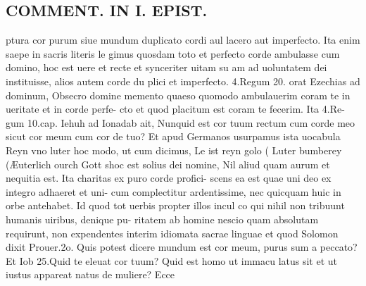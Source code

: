 \documentclass{article}
\begin{document}
\begin{pages}
\section*{COMMENT. IN I. EPIST. }\pstart ptura cor purum siue mundum duplicato cordi aul lacero aut imperfecto. Ita enim saepe in sacris literis le gimus quosdam toto et perfecto corde ambulasse cum domino, hoc est uere et recte et synceriter uitam su am ad uoluntatem dei instituisse, alios autem corde du plici et imperfecto. 4.Regum 20. orat Ezechias ad dominum, Obsecro domine memento quaeso quomodo ambulauerim coram te in ueritate et in corde perfe- cto et quod placitum est coram te fecerim. Ita 4.Re- gum 10.cap. Iehuh ad Ionadab ait, Nunquid est cor tuum rectum cum corde meo sicut cor meum cum cor de tuo? Et apud Germanos usurpamus ista uocabula Reyn vno luter hoc modo, ut cum dicimus, Le ist reyn golo ( Luter bumberey (Æuterlich ourch Gott shoc est solius dei nomine, Nil aliud quam aurum et nequitia est. Ita charitas ex puro corde profici- scens ea est quae uni deo ex integro adhaeret et uni- cum complectitur ardentissime, nec quicquam huic in orbe antehabet. Id quod tot uerbis propter illos incul co qui nihil non tribuunt humanis uiribus, denique pu- ritatem ab homine nescio quam absolutam requirunt, non expendentes interim idiomata sacrae linguae et quod Solomon dixit Prouer.2o. Quis potest dicere mundum est cor meum, purus sum a peccato? Et Iob 25.Quid te eleuat cor tuum? Quid est homo ut immacu latus sit et ut iustus appareat natus de muliere? Ecce  \pend

\end{pages}
\end{document}
